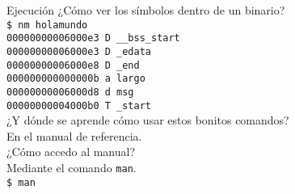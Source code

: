 \documentclass[aspectratio=169]{beamer}
\begin{document}
\begin{frame}[fragile,t]{Ejecución}
    \small
    \textcolor{verdeuca}{¿Cómo ver los símbolos dentro de un binario?}\\
    \pause
    \vspace{0.2cm}
    \verb|$ nm holamundo|\\
    \vspace{0.2cm}
    \pause
    \verb|00000000006000e3 D __bss_start|\\
    \verb|00000000006000e3 D _edata|\\
    \verb|00000000006000e8 D _end|\\
    \verb|000000000000000b a largo|\\
    \verb|00000000006000d8 d msg|\\
    \verb|00000000004000b0 T _start|\\
    \pause
    \vspace{0.4cm}
    \textcolor{verdeuca}{¿Y dónde se aprende cómo usar estos bonitos comandos?}\\
    \pause
    \vspace{0.2cm}
    En el manual de referencia.\\
    \pause
    \vspace{0.4cm}
    \textcolor{verdeuca}{¿Cómo accedo al manual?}\\
    \pause
    \vspace{0.2cm}
    Mediante el comando \texttt{man}.\\
    \vspace{0.2cm}
    \verb|$ man | \fbox{\textcolor{verdeuca}{comando}}
\end{frame}
\end{document}
